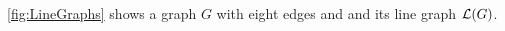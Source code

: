 \begin{Example}\label{ex:LineGrpahs}
\cref{fig:LineGraphs} shows a graph $G$ with eight edges and and its line graph $\operatorname{\mathcal L}(G)$.
\begin{figure}[!htbp]
	\centering
	 \hspace{5em}

\end{figure}
\end{Example}
